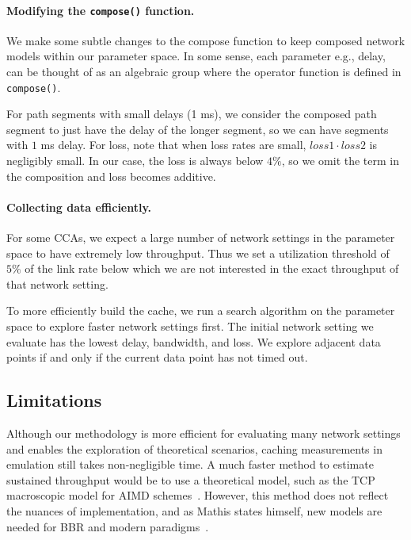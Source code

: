 \paragraph{Modifying the \texttt{compose()} function.}
We make some subtle changes to the compose function to keep composed network
models within our parameter space.
In some sense, each parameter e.g., delay, can be thought of as an algebraic
group where the operator function is defined in \texttt{compose()}.

For path segments with small delays (1 ms),
we consider the composed path segment to
just have the delay of the longer segment, so we can have segments
with $1$ ms delay. For loss, note that when loss rates are small, $loss1 \cdot
loss2$ is negligibly small. In our case, the loss is always below $4\%$, so we
omit the term in the composition and loss becomes additive.

\paragraph{Collecting data efficiently.}
For some CCAs, we expect a large number of network settings in the parameter
space to have extremely low throughput. Thus we set a utilization threshold of
$5\%$ of the link rate below which we are not interested in the exact throughput
of that network setting.

To more efficiently build the cache, we run a search algorithm on
the parameter space to explore faster network settings first.
The initial network setting we evaluate has the lowest delay, bandwidth, and
loss. We explore adjacent data points if and only if the current data point has
not timed out.

\subsection{Limitations}
\label{sec:splitting:heuristic:limitations}

Although our methodology is more efficient for evaluating many network
settings and enables the exploration of theoretical scenarios,
caching measurements in emulation still takes non-negligible time. A much faster
method to estimate sustained throughput would be to use a theoretical model, such as the
TCP macroscopic model for AIMD schemes~\cite{mathis1997macroscopic}.
However, this method does not reflect the nuances of implementation, and as
Mathis states himself, new models are needed for BBR and modern paradigms~\cite
{mathis2019deprecating,mathis2008reflections}.

